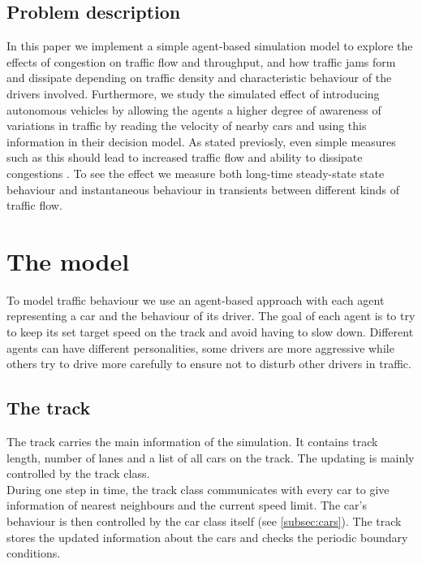 \documentclass[11pt,a4paper,twocolumn]{article}
\begin{document}
\subsection{Problem description}
In this paper we implement a simple agent-based simulation model to explore the effects of congestion on traffic flow and throughput, and how traffic jams form and dissipate depending on traffic density and characteristic behaviour of the drivers involved. Furthermore, we study the simulated effect of introducing autonomous vehicles by allowing the agents a higher degree of awareness of variations in traffic by reading the velocity of nearby cars and using this information in their decision model. As stated previosly, even simple measures such as this should lead to increased traffic flow and ability to dissipate congestions \cite{stern17autonomous}. To see the effect we measure both long-time steady-state state behaviour and instantaneous behaviour in transients between different kinds of traffic flow.

\section{The model}
To model traffic behaviour we use an agent-based approach with each agent representing a car and the behaviour of its driver. The goal of each agent is to try to keep its set target speed on the track and avoid having to slow down. Different agents can have different personalities, some drivers are more aggressive while others try to drive more carefully to ensure not to disturb other drivers in traffic.

\subsection{The track}\label{subsec:track}
The track carries the main information of the simulation. It contains track length, number of lanes and a list of all cars on the track. The updating is mainly controlled by the track class.  \\
During one step in time, the track class communicates with every car to give information of nearest neighbours and the current speed limit. The car's behaviour is then controlled by the car class itself (see \ref{subsec:cars}). The track stores the updated information about the cars and checks the periodic boundary conditions. \\
\end{document}
